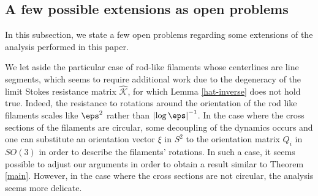 \subsection{A few possible extensions as open problems}
\label{sec-mr-op}

In this subsection, we state a few open problems regarding some extensions of the analysis performed in this paper.
\begin{op}
We let aside the particular case of rod-like filaments whose centerlines are line segments, which seems to require additional work due to the degeneracy of the limit Stokes resistance matrix $\hat {\mathcal K}$, for which Lemma \ref{hat-inverse} does not hold true. Indeed, the resistance to rotations around the orientation of the rod like filaments scales like $\eps^2$ rather than $\left|\log \eps\right|^{-1}$.
In the case where the cross sections of the filaments are circular, some decoupling of the dynamics occurs and one can substitute an orientation vector $\xi $ in $S^2$ to the orientation matrix $Q_i $ in $SO(3)$ in order to describe the filaments' rotations. In such a case, it seems possible to adjust our arguments in order to obtain a result similar to Theorem \ref{main}. However, in the case where the cross sections are not circular, the analysis seems more delicate.
\end{op}
